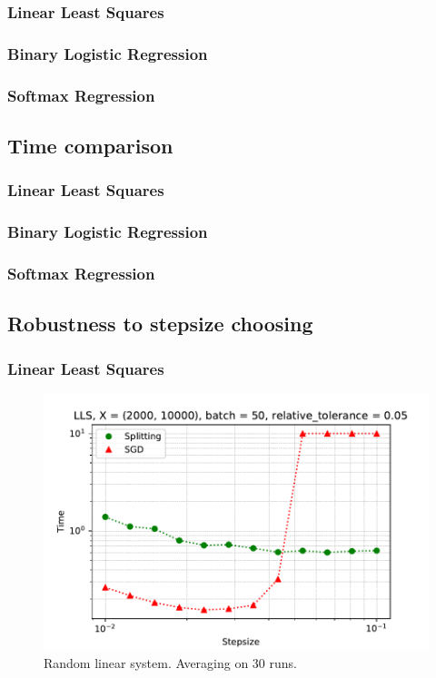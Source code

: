 \documentclass{article}
\begin{document}
\subsubsection{Linear Least Squares}
\subsubsection{Binary Logistic Regression}
\subsubsection{Softmax Regression}

\subsection{Time comparison}

\subsubsection{Linear Least Squares}
\subsubsection{Binary Logistic Regression}
\subsubsection{Softmax Regression}

\subsection{Robustness to stepsize choosing}

\subsubsection{Linear Least Squares}

\begin{figure}[ht]
\vskip 0.2in
\begin{center}
\centerline{\includegraphics[width=\columnwidth]{sgd_split_iterations_lls.pdf}}
\caption{Random linear system. Averaging on 30 runs.}
\label{strang:fig:lls_step_iter}
\end{center}
\vskip -0.2in
\end{figure}
\end{document}
